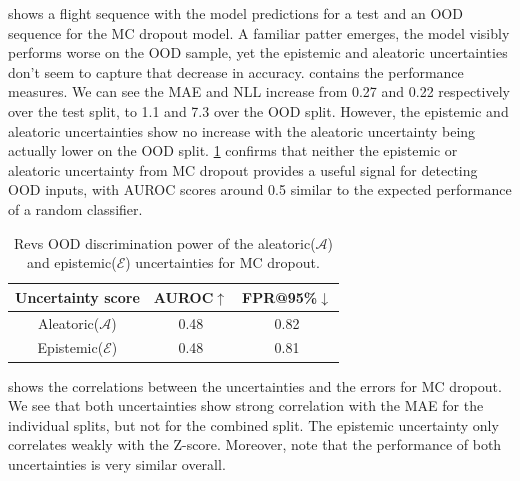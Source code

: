  shows a flight sequence with the model predictions for a test and an OOD sequence for the MC dropout model. A familiar patter emerges, the model visibly performs worse on the OOD sample, yet the epistemic and aleatoric uncertainties don't seem to capture that decrease in accuracy.  contains the performance measures. We can see the MAE and NLL increase from 0.27 and 0.22 respectively over the test split, to 1.1 and 7.3 over the OOD split. However, the epistemic and aleatoric uncertainties show no increase with the aleatoric uncertainty being actually lower on the OOD split. \cref{tbl:bb2_dropout_discrimination} confirms that neither the epistemic or aleatoric uncertainty from MC dropout provides a useful signal for detecting OOD inputs, with AUROC scores around 0.5 similar to the expected performance of a random classifier. 


\begin{table}[h]
\centering
    \begin{tabular}{c  c  c}  
        \toprule
        Uncertainty score & AUROC$\uparrow$ & FPR@95\%$\downarrow$\\
        \midrule
        Aleatoric($\mathcal{A}$) & 0.48  & 0.82\\
        Epistemic($\mathcal{E}$) & 0.48 &  0.81 \\
        \midrule
    \end{tabular}
    \caption{Revs OOD discrimination power of the aleatoric($\mathcal{A}$) and epistemic($\mathcal{E}$) uncertainties for MC dropout.}
    \label{tbl:bb2_dropout_discrimination}
\end{table}

 shows the correlations between the uncertainties and the errors for MC dropout. We see that both uncertainties show strong correlation with the MAE for the individual splits, but not for the combined split. The epistemic uncertainty only correlates weakly with the Z-score. Moreover, note that the performance of both uncertainties is very similar overall. 


